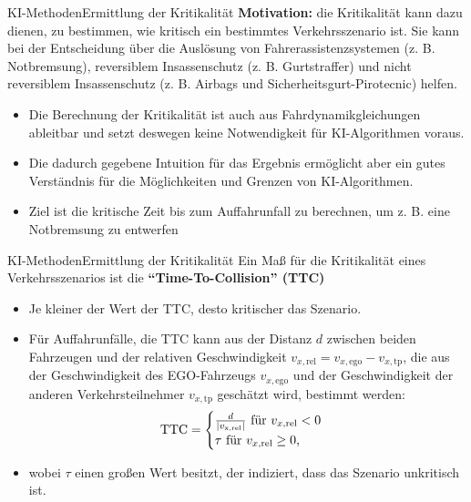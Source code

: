 \documentclass[169, handout	]{THIbeamer} %
\begin{document}
	\begin{frame}{KI-Methoden}{Ermittlung der Kritikalität}
		\textbf{Motivation: }die Kritikalität kann dazu dienen, zu bestimmen, wie kritisch ein bestimmtes Verkehrsszenario ist. Sie kann bei der Entscheidung über die Auslösung von Fahrerassistenzsystemen (z. B. Notbremsung), reversiblem Insassenschutz (z. B. Gurtstraffer) und nicht reversiblem Insassenschutz (z. B. Airbags und Sicherheitsgurt-Pirotecnic) helfen.
		\begin{itemize}
			\item Die Berechnung der Kritikalität ist auch aus Fahrdynamikgleichungen ableitbar und setzt deswegen keine Notwendigkeit für KI-Algorithmen voraus.
			\item Die dadurch gegebene Intuition für das Ergebnis ermöglicht aber ein gutes Verständnis für die Möglichkeiten und Grenzen von KI-Algorithmen.
			\item Ziel ist die kritische Zeit bis zum Auffahrunfall zu berechnen, um z. B. eine Notbremsung zu entwerfen
		\end{itemize}
	\end{frame}






	\begin{frame}{KI-Methoden}{Ermittlung der Kritikalität}
		Ein Maß für die Kritikalität eines Verkehrsszenarios ist die \textbf{\enquote{Time-To-Collision} (TTC)} \\ 
		\begin{itemize}
			\item Je kleiner der Wert der TTC, desto kritischer das Szenario.
			\item Für Auffahrunfälle, die TTC kann aus der Distanz $d$  zwischen beiden Fahrzeugen und der relativen Geschwindigkeit $v_{x,\text{rel}}=v_{x,\text{ego}}-v_{x,\text{tp}}$, die aus der Geschwindigkeit des EGO-Fahrzeugs $v_{x,\text{ego}}$ und der Geschwindigkeit der anderen Verkehrsteilnehmer $v_{x,\text{tp}}$ geschätzt wird, bestimmt werden:
			\begin{equation}
				\text{TTC} = 
				\begin{cases}
					\frac{d}{|v_{\text{x,\text{rel}}}|} \text{ für } v_{x,\text{rel}}<0 \\
					\tau \text{ für } v_{x,\text{rel}} \geq 0 \text{,}
				\end{cases}
			\end{equation}
			\item[] wobei $\tau$ einen großen Wert besitzt, der indiziert, dass das Szenario unkritisch ist.
		\end{itemize}			
	\end{frame}
\end{document}
